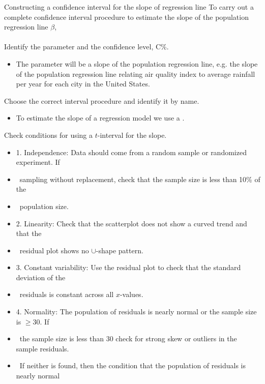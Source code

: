 \begin{onebox}{Constructing a confidence interval for the slope of regression line}
To carry out a complete confidence interval procedure to estimate the slope of the population regression line $\beta$,
\\
\\
 Identify the parameter and the confidence level, C\%.\vspace{-1mm}
\begin{itemize} 
\item[] The parameter will be a slope of the population regression line, e.g. the slope of the population regression line relating air quality index to average rainfall per year for each city in the United States.  
\end{itemize}
 Choose the correct interval procedure and identify it by name. \vspace{-1mm}
\begin{itemize}
\item[] To estimate the slope of a regression model we use a .
\end{itemize}
 Check conditions for using a $t$-interval for the slope.\vspace{-1mm}
\begin{itemize}
\setlength{\itemsep}{0mm}
\item[]  1. Independence:  Data should come from a random sample or randomized experiment.  If 
\item[] \ \quad sampling without replacement, check that the sample size is less than 10\% of the 
\item[] \ \quad population size.
\item[] 2.  Linearity:  Check that the scatterplot does not show a curved trend and that the 
\item[] \ \quad residual plot shows no $\cup$-shape pattern.  
\item[] 3.  Constant variability:  Use the residual plot to check that the standard deviation of the 
\item[] \ \quad residuals is constant across all $x$-values.
\item[] 4. Normality:  The population of residuals is nearly normal or the sample size is $\ge 30$.  If 
\item[] \ \quad the sample size is less than 30 check for strong skew or outliers in the sample residuals.  
\item[] \ \quad If neither is found, then the condition that the population of residuals is nearly normal 

\end{itemize}
\end{onebox}
